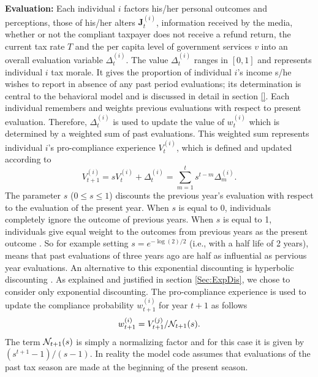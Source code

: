 \documentclass{NSF_proposal_mod}
\begin{document}
{\bf Evaluation:} Each individual $i$ factors his/her personal outcomes and perceptions, those of his/her alters $\mathbf{J}^{(i)}_t$, information received by the media, whether or not the compliant taxpayer does not receive a refund return, the current tax rate $T$ and  the per capita level of government services $v$ into an overall evaluation variable $\Delta^{(i)}_t$. The value $\Delta^{(i)}_t$ ranges in $[0,1]$ and represents individual $i$ tax morale. It gives the proportion of individual $i$'s income s/he wishes to report in absence of any past period evaluations;  its determination is central to the behavioral model and is discussed in detail in section \ref{}.  Each individual remembers and weights previous evaluations with respect to present evaluation. Therefore, $\Delta^{(i)}_t$ is used to update the value of $w^{(i)}_{t}$ which is determined by a weighted sum of past evaluations. This weighted sum represents individual $i$'s pro-compliance experience $V^{(i)}_{t}$, which is defined and updated according to 
\begin{equation}
V^{(i)}_{t+1}=s V^{(i)}_{t}+\Delta^{(i)}_t = \sum_{m=1}^{t} s^{t-m} \Delta_m^{(i)}.
\label{eq:pro-compliance_experience}
\end{equation}
The parameter $s$ ($0\leq s\leq  1$) discounts the previous year's evaluation with respect to the evaluation of the present year.  When $s$ is equal to 0, individuals completely ignore the outcome of previous years.  When $s$ is equal to 1, individuals give equal weight to the outcomes from previous years as the present outcome \cite[]{Schweighofer2006}. So for example setting $s=e^{-\log(2)/2}$ (i.e., with a half life of 2 years), means that past evaluations of three years ago  are half as influential as pervious year evaluations.  An alternative to this exponential discounting is hyperbolic discounting \cite[]{Kim2008}. As explained and justified in section \ref{Sec:ExpDis}, we chose to consider only exponential discounting. The pro-compliance experience is used to update the compliance probability $w^{(i)}_{t+1}$ for year $t+1$ as follows 
\begin{equation}
w^{(i)}_{t+1}= V^{(j)}_{t+1} /{\cal N}_{t+1}(s).
\label{eq:w}
\end{equation}
The term ${\cal N}_{t+1}(s)$ is simply a normalizing factor and for this case it is given by $(s^{t+1}-1)/(s-1)$. In reality the model code assumes that evaluations of the past tax season are made at the beginning of the present season. 


\end{document}
